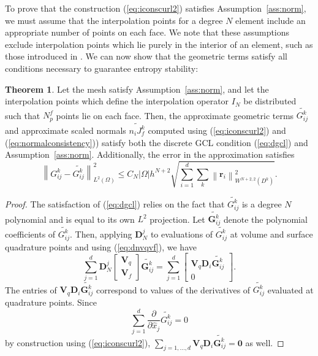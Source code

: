 \documentclass[10pt]{amsart}
\theoremstyle{definition}
\theoremstyle{lemma}
\theoremstyle{theorem}
\newtheorem{theorem}{Theorem}
\theoremstyle{assumption}
\renewcommand{\hat}{\widehat}
\renewcommand{\tilde}{\widetilde}
\newcommand{\pd}[2]{\frac{\partial#1}{\partial#2}}
\newcommand{\nor}[1]{\left\| #1 \right\|}
\newcommand{\LRp}[1]{\left( #1 \right)}
\newcommand{\LRs}[1]{\left[ #1 \right]}
\newcommand{\LRb}[1]{\left| #1 \right|}
\begin{document}
{To prove that the construction (\ref{eq:iconscurl2}) satisfies Assumption~\ref{ass:norm}, we must assume that the interpolation points for a degree $N$ element include an appropriate number of points on each face.  We note that these assumptions exclude interpolation points which lie purely in the interior of an element, such as those introduced in \cite{williams2014symmetric, witherden2015identification}.  We can now show that the geometric terms satisfy all conditions necessary to guarantee entropy stability:
\begin{theorem}
Let the mesh satisfy Assumption~\ref{ass:norm}, and let the interpolation points which define the interpolation operator $I_N$ be distributed such that $N^f_p$ points lie on each face. Then, the approximate geometric terms $\tilde{G^k_{ij}}$  and approximate scaled normals $\tilde{n_iJ^k_f}$ computed using (\ref{eq:iconscurl2}) and (\ref{eq:normalconsistency})) satisfy both the discrete GCL condition (\ref{eq:dgcl}) and Assumption~\ref{ass:norm}.  Additionally, the error in the approximation satisfies
\[
\nor{{G^k_{ij}}-\tilde{G^k_{ij}}}_{L^2\LRp{\Omega}}^2  \leq C_N \LRb{\Omega} h^{N+2} \sqrt{\sum_{i=1}^d \sum_k \nor{\bm{r}_i}^2_{W^{N+2,2}\LRp{D^k}}}.
\]
\label{thm:koprivagcl}
\end{theorem}
\begin{proof}
  The satisfaction of (\ref{eq:dgcl}) relies on the fact that $\tilde{G^k_{ij}}$ is a degree $N$ polynomial and is equal to its own $L^2$ projection.  Let $\tilde{\bm{G}^k_{ij}}$ denote the polynomial coefficients of $\tilde{G^k_{ij}}$.  
Then, applying $\bm{D}^j_N$ to evaluations of $\tilde{G^k_{ij}}$ at volume and surface quadrature points and using (\ref{eq:dnvqvf}), we have
\[
\sum_{j=1}^d\bm{D}^j_N \LRs{
\begin{array}{c}
\bm{V}_q\\
\bm{V}_f
\end{array}}
\tilde{\bm{G}^k_{ij}} = 
\sum_{j=1}^d \LRs{\begin{array}{c}
\bm{V}_q\bm{D}_i\tilde{\bm{G}^k_{ij}} \\
0
\end{array}}.
\]
The entries of $\bm{V}_q\bm{D}_i\tilde{\bm{G}^k_{ij}}$ correspond to values of the derivatives of $\tilde{G^k_{ij}}$ evaluated at quadrature points.  Since 
\[
\sum_{j=1}^d\pd{}{\hat{x}_j}\tilde{G^k_{ij}} = 0
\]
by construction using (\ref{eq:iconscurl2}), $\sum_{j=1,\ldots,d} \bm{V}_q\bm{D}_i\tilde{\bm{G}^k_{ij}} = \bm{0}$ as well.  


\end{proof}}
\end{document}
